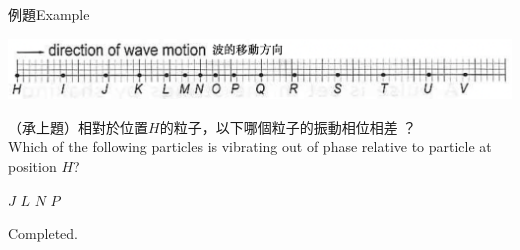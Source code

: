 \documentclass[beamer=true]{standalone}
\begin{document}
\begin{frame}[t]{例題Example}
    \par{\par\centering\includegraphics[width=.9\textwidth]{./img/ch1b_2024-05-17-12-25-33.png}\par}
    （承上題）相對於位置$H$的粒子，以下哪個粒子的振動相位相差 ？\\Which of the following particles is vibrating  out of phase relative to particle at position $H$?
    \begin{tasks}
        \task $J$
        \task $L$
        \task $N$
        \task $P$
    \end{tasks}
    \vfill\raggedleft Completed.
\end{frame}
\end{document}

